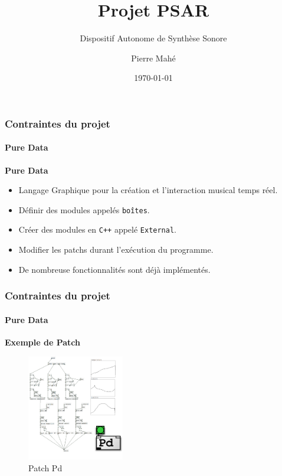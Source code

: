 \documentclass{beamer}
\title{Projet PSAR}
\subtitle{Dispositif Autonome de Synthèse Sonore}
\institute{Encadrant : Hugues Genevois}
\author{Pierre Mahé}
\date{\today}
\begin{document}
\begin{frame}
\titlepage
\end{frame}


\begin{frame}
\frametitle{Contraintes du projet}
\framesubtitle{Pure Data}
\textbf{Pure Data}
\begin{itemize}
\item Langage Graphique pour la création et l'interaction musical temps réel.
\item Définir des modules appelés \texttt{boîtes}.
\item Créer des modules en \texttt{C++} appelé \texttt{External}.
\item Modifier les patchs durant l’exécution du programme.
\item De nombreuse fonctionnalités sont déjà implémentés.
\end{itemize}
\end{frame}

\begin{frame}
\frametitle{Contraintes du projet}
\framesubtitle{Pure Data}
\textbf{Exemple de Patch}
\begin{figure}
  \centering
  \includegraphics[width=160px]{pd.jpg} 
	\caption{Patch Pd}
\end{figure}
\end{frame}
\end{document}
